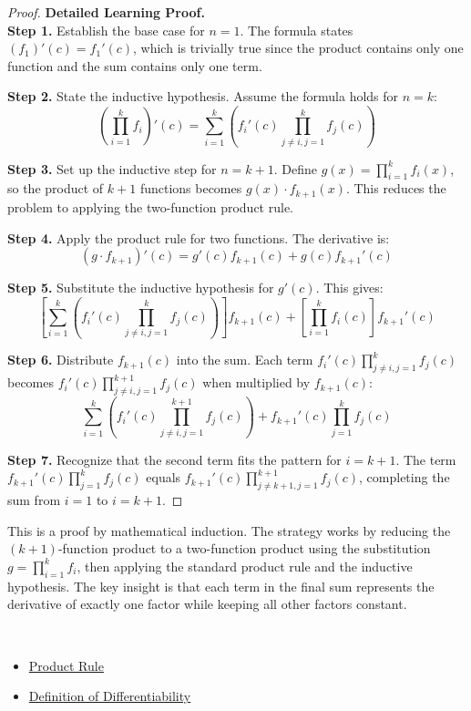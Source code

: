 \begin{proof}
\textbf{Detailed Learning Proof.}~\\

\textbf{Step 1.} Establish the base case for $n=1$. The formula states $(f_1)'(c) = f_1'(c)$, which is trivially true since the product contains only one function and the sum contains only one term.

\textbf{Step 2.} State the inductive hypothesis. Assume the formula holds for $n=k$:
\[ \left( \prod_{i=1}^{k} f_i \right)'(c) = \sum_{i=1}^{k} \left( f_i'(c) \prod_{j \neq i, j=1}^{k} f_j(c) \right) \]

\textbf{Step 3.} Set up the inductive step for $n=k+1$. Define $g(x) = \prod_{i=1}^{k} f_i(x)$, so the product of $k+1$ functions becomes $g(x) \cdot f_{k+1}(x)$. This reduces the problem to applying the two-function product rule.

\textbf{Step 4.} Apply the product rule for two functions. The derivative is:
\[ (g \cdot f_{k+1})'(c) = g'(c)f_{k+1}(c) + g(c)f_{k+1}'(c) \]

\textbf{Step 5.} Substitute the inductive hypothesis for $g'(c)$. This gives:
\[ \left[ \sum_{i=1}^{k} \left( f_i'(c) \prod_{j \neq i, j=1}^{k} f_j(c) \right) \right] f_{k+1}(c) + \left[ \prod_{i=1}^{k} f_i(c) \right] f_{k+1}'(c) \]

\textbf{Step 6.} Distribute $f_{k+1}(c)$ into the sum. Each term $f_i'(c) \prod_{j \neq i, j=1}^{k} f_j(c)$ becomes $f_i'(c) \prod_{j \neq i, j=1}^{k+1} f_j(c)$ when multiplied by $f_{k+1}(c)$:
\[ \sum_{i=1}^{k} \left( f_i'(c) \prod_{j \neq i, j=1}^{k+1} f_j(c) \right) + f_{k+1}'(c) \prod_{j=1}^{k} f_j(c) \]

\textbf{Step 7.} Recognize that the second term fits the pattern for $i=k+1$. The term $f_{k+1}'(c) \prod_{j=1}^{k} f_j(c)$ equals $f_{k+1}'(c) \prod_{j \neq k+1, j=1}^{k+1} f_j(c)$, completing the sum from $i=1$ to $i=k+1$.
\end{proof}

\begin{remark*}
This is a proof by mathematical induction. The strategy works by reducing the $(k+1)$-function product to a two-function product using the substitution $g = \prod_{i=1}^{k} f_i$, then applying the standard product rule and the inductive hypothesis. The key insight is that each term in the final sum represents the derivative of exactly one factor while keeping all other factors constant.
\end{remark*}

\begin{remark*}[Dependencies]~\\
\begin{itemize}
  \item \hyperref[thm:product-rule]{Product Rule}
  \item \hyperref[def:differentiability]{Definition of Differentiability}
\end{itemize}
\end{remark*}